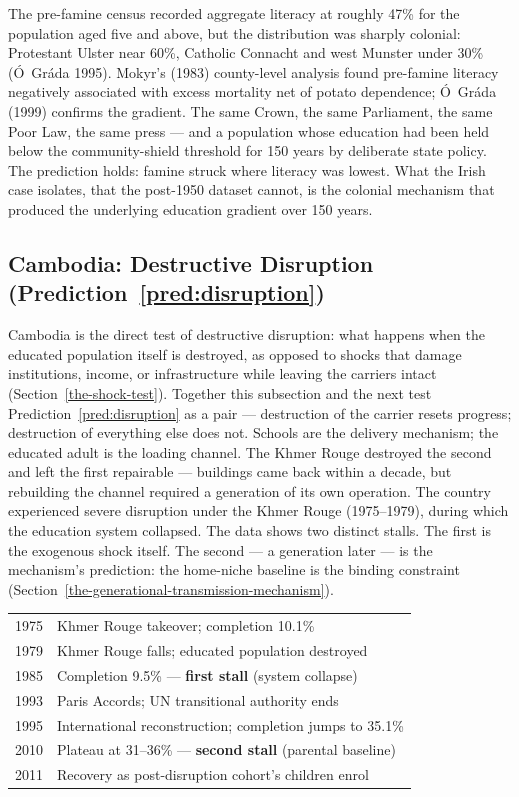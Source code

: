 \documentclass[12pt,letterpaper]{article}
\begin{document}
The pre-famine census recorded aggregate
literacy at roughly 47\% for the population aged five and above, but
the distribution was sharply colonial: Protestant Ulster near 60\%,
Catholic Connacht and west Munster under 30\% (Ó~Gráda 1995). Mokyr's
(1983) county-level analysis found pre-famine literacy negatively
associated with excess mortality net of potato dependence;
Ó~Gráda (1999) confirms the gradient. The same Crown, the same
Parliament, the same Poor Law, the same press --- and a population
whose education had been held below the community-shield threshold for
150 years by deliberate state policy. The prediction holds: famine
struck where literacy was lowest. What the Irish case isolates, that
the post-1950 dataset cannot, is the colonial mechanism that produced
the underlying education gradient over 150 years.

\subsection{Cambodia: Destructive Disruption (Prediction~\ref{pred:disruption})}\label{cambodia-the-pt-shadow}

Cambodia is the direct test of destructive disruption: what happens
when the educated population itself is destroyed, as opposed to
shocks that damage institutions, income, or infrastructure while
leaving the carriers intact (Section~\ref{the-shock-test}). Together
this subsection and the next test
Prediction~\ref{pred:disruption} as a pair --- destruction of the
carrier resets progress; destruction of everything else does not. Schools are the
delivery mechanism; the educated adult is the loading channel. The
Khmer Rouge destroyed the second and left the first repairable ---
buildings came back within a decade, but rebuilding the channel
required a generation of its own operation. The country experienced
severe disruption under the Khmer Rouge (1975--1979), during which
the education system collapsed. The
data shows two distinct stalls. The first is the exogenous shock itself.
The second --- a generation later --- is the mechanism's prediction: the
home-niche baseline is the binding constraint (Section~\ref{the-generational-transmission-mechanism}).

\begin{center}
\small
\begin{tabular}{@{}ll@{}}
\toprule
1975 & Khmer Rouge takeover; completion 10.1\% \\
1979 & Khmer Rouge falls; educated population destroyed \\
1985 & Completion 9.5\% --- \textbf{first stall} (system collapse) \\
1993 & Paris Accords; UN transitional authority ends \\
1995 & International reconstruction; completion jumps to 35.1\% \\
2010 & Plateau at 31--36\% --- \textbf{second stall} (parental baseline) \\
2011 & Recovery as post-disruption cohort's children enrol \\
\bottomrule
\end{tabular}
\end{center}
\end{document}
